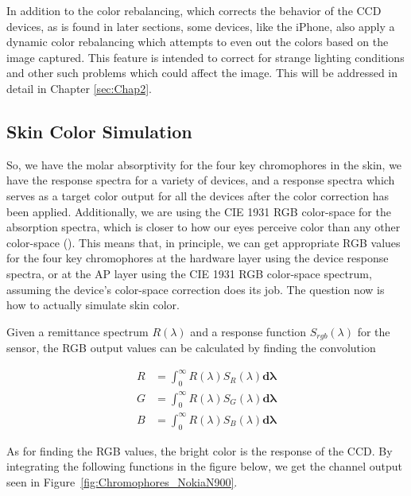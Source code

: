 In addition to the color rebalancing, which corrects the behavior of the CCD devices, as is found in later sections, some devices, like the iPhone, also apply a dynamic color rebalancing which attempts to even out the colors based on the image captured. This feature is intended to correct for strange lighting conditions and other such problems which could affect the image. This will be addressed in detail in Chapter \ref{sec:Chap2}.

\clearpage

\subsection{Skin Color Simulation} \label{sec:SkinColorSimulation}

So, we have the molar absorptivity for the four key chromophores in the skin, we have the response spectra for a variety of devices, and a response spectra which serves as a target color output for all the devices after the color correction has been applied. Additionally, we are using the CIE 1931 RGB color-space for the absorption spectra, which is closer to how our eyes perceive color than any other color-space (\cite{RIDI2013}). This means that, in principle, we can get appropriate RGB values for the four key chromophores at the hardware layer using the device response spectra, or at the AP layer using the CIE 1931 RGB color-space spectrum, assuming the device's color-space correction does its job. The question now is how to actually simulate skin color.

Given a remittance spectrum $R(\lambda)$ and a response function $S_{rgb}(\lambda)$ for the sensor, the RGB output values can be calculated by finding the convolution 

\begin{align}
R & = \int_{0}^{\infty} R(\lambda) S_{R} (\lambda)  \mathbf{d\lambda}\\
G & = \int_{0}^{\infty} R(\lambda) S_{G} (\lambda) \mathbf{d\lambda}\\
B & = \int_{0}^{\infty} R(\lambda) S_{B} (\lambda)  \mathbf{d\lambda}
\end{align}

As for finding the RGB values, the bright color is the response of the CCD. By integrating the following functions in the figure below, we get the channel output seen in Figure~\ref{fig:Chromophores_NokiaN900}.


